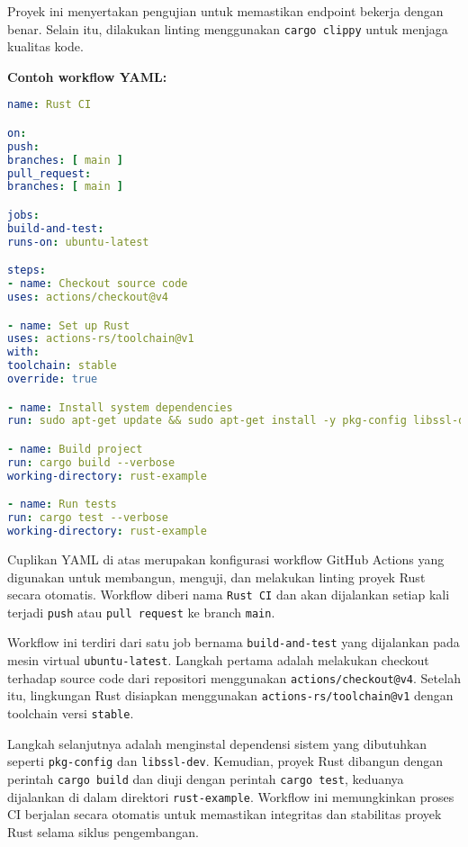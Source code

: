 Proyek ini menyertakan pengujian untuk memastikan endpoint bekerja dengan benar. Selain itu, dilakukan linting menggunakan \texttt{cargo clippy} untuk menjaga kualitas kode.

\textbf{Contoh workflow YAML:}

\begin{lstlisting}[language=yaml, caption={Workflow Build, Test, dan Lint untuk Rust}]
name: Rust CI

on:
push:
branches: [ main ]
pull_request:
branches: [ main ]

jobs:
build-and-test:
runs-on: ubuntu-latest

steps:
- name: Checkout source code
uses: actions/checkout@v4

- name: Set up Rust
uses: actions-rs/toolchain@v1
with:
toolchain: stable
override: true

- name: Install system dependencies
run: sudo apt-get update && sudo apt-get install -y pkg-config libssl-dev

- name: Build project
run: cargo build --verbose
working-directory: rust-example

- name: Run tests
run: cargo test --verbose
working-directory: rust-example


\end{lstlisting}

Cuplikan YAML di atas merupakan konfigurasi workflow GitHub Actions yang digunakan untuk membangun, menguji, dan melakukan linting proyek Rust secara otomatis. Workflow diberi nama \texttt{Rust CI} dan akan dijalankan setiap kali terjadi \texttt{push} atau \texttt{pull request} ke branch \texttt{main}.

Workflow ini terdiri dari satu job bernama \texttt{build-and-test} yang dijalankan pada mesin virtual \texttt{ubuntu-latest}. Langkah pertama adalah melakukan checkout terhadap source code dari repositori menggunakan \texttt{actions/checkout@v4}. Setelah itu, lingkungan Rust disiapkan menggunakan \texttt{actions-rs/toolchain@v1} dengan toolchain versi \texttt{stable}.

Langkah selanjutnya adalah menginstal dependensi sistem yang dibutuhkan seperti \texttt{pkg-config} dan \texttt{libssl-dev}. Kemudian, proyek Rust dibangun dengan perintah \texttt{cargo build} dan diuji dengan perintah \texttt{cargo test}, keduanya dijalankan di dalam direktori \texttt{rust-example}. Workflow ini memungkinkan proses CI berjalan secara otomatis untuk memastikan integritas dan stabilitas proyek Rust selama siklus pengembangan.


